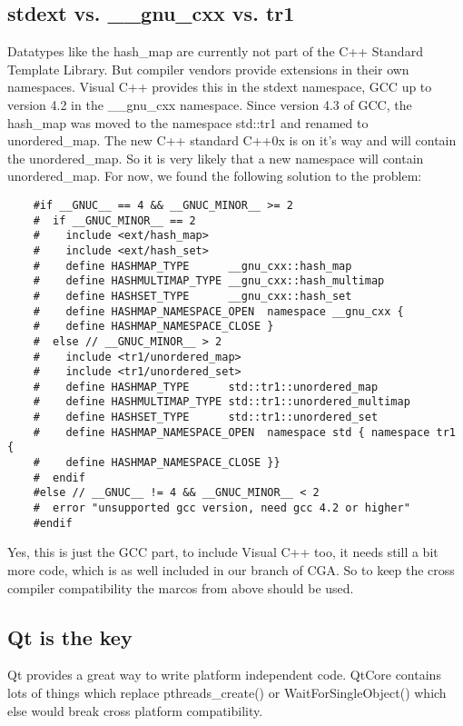 \subsection{stdext vs. \_\_gnu\_cxx vs. tr1} Datatypes like the hash\_map are currently not part of the C++ Standard Template Library. But compiler vendors provide extensions in their own namespaces. Visual C++ provides this in the stdext namespace, GCC up to version 4.2 in the \_\_gnu\_cxx namespace. Since version 4.3 of GCC, the hash\_map was moved to the namespace std::tr1 and renamed to unordered\_map. The new C++ standard C++0x is on it's way and will contain the unordered\_map. So it is very likely that a new namespace will contain unordered\_map. For now, we found the following solution to the problem:
\begin{verbatim}
    #if __GNUC__ == 4 && __GNUC_MINOR__ >= 2
    #  if __GNUC_MINOR__ == 2
    #    include <ext/hash_map>
    #    include <ext/hash_set>
    #    define HASHMAP_TYPE      __gnu_cxx::hash_map
    #    define HASHMULTIMAP_TYPE __gnu_cxx::hash_multimap
    #    define HASHSET_TYPE      __gnu_cxx::hash_set
    #    define HASHMAP_NAMESPACE_OPEN  namespace __gnu_cxx {
    #    define HASHMAP_NAMESPACE_CLOSE }
    #  else // __GNUC_MINOR__ > 2
    #    include <tr1/unordered_map>
    #    include <tr1/unordered_set>
    #    define HASHMAP_TYPE      std::tr1::unordered_map
    #    define HASHMULTIMAP_TYPE std::tr1::unordered_multimap
    #    define HASHSET_TYPE      std::tr1::unordered_set
    #    define HASHMAP_NAMESPACE_OPEN  namespace std { namespace tr1 {
    #    define HASHMAP_NAMESPACE_CLOSE }}
    #  endif
    #else // __GNUC__ != 4 && __GNUC_MINOR__ < 2
    #  error "unsupported gcc version, need gcc 4.2 or higher"
    #endif
\end{verbatim}
Yes, this is just the GCC part, to include Visual C++ too, it needs still a bit more code, which is as well included in our branch of CGA. So to keep the cross compiler compatibility the marcos from above should be used. 

\subsection{Qt is the key} Qt provides a great way to write platform independent code. QtCore contains lots of things which replace pthreads\_create() or WaitForSingleObject() which else would break cross platform compatibility. 

